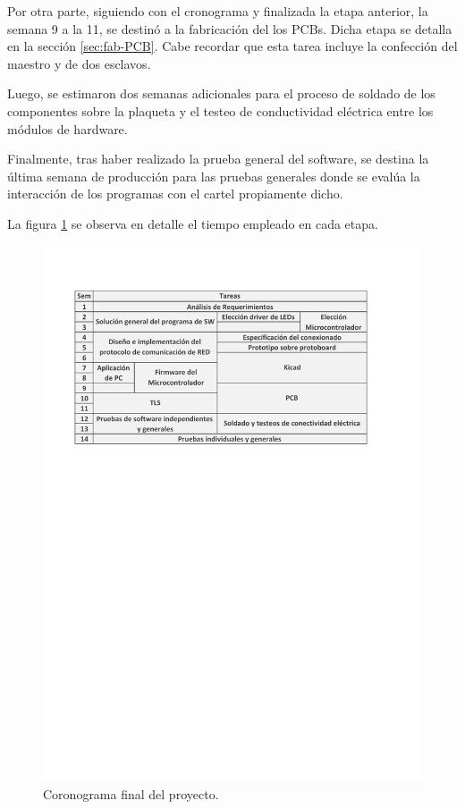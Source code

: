 Por otra parte, siguiendo con el cronograma y finalizada la etapa anterior, la semana 9 a la 11, se destinó a la fabricación del los PCBs. Dicha etapa se detalla en la sección \ref{sec:fab-PCB}. Cabe recordar que esta tarea incluye la confección del maestro y de dos esclavos.

Luego, se estimaron dos semanas adicionales para el proceso de soldado de los componentes sobre la plaqueta y el testeo de conductividad eléctrica entre los módulos de hardware.

Finalmente, tras haber realizado la prueba general del software, se destina la última semana de producción para las pruebas generales donde se evalúa la interacción de los programas con el cartel propiamente dicho.

La figura \ref{fig:cronograma} se observa en detalle el tiempo empleado en cada etapa.

\begin{figure}[ht!]
	\begin{center}
		\centering
		\includegraphics[width=\linewidth]{tablas/cronograma-v2.pdf}
		\caption{Coronograma final del proyecto.}
		\label{fig:cronograma}
	\end{center}
\end{figure}


